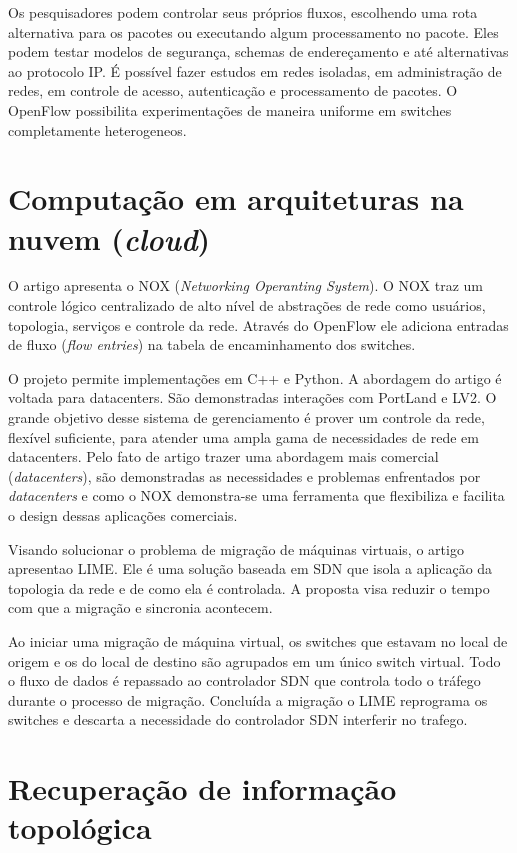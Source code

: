 Os pesquisadores podem controlar seus próprios fluxos, escolhendo uma rota
alternativa para os pacotes ou executando algum processamento no pacote. 
Eles podem testar modelos de segurança, schemas de endereçamento e até 
alternativas ao protocolo IP. 
É possível fazer estudos em redes isoladas, em administração de redes, 
em controle de acesso, autenticação e processamento de pacotes.
O OpenFlow possibilita experimentações de maneira uniforme em switches 
completamente heterogeneos. 

\section{Computação em arquiteturas na nuvem (\emph{cloud})}

O artigo \citep{arsalan2009applying} apresenta o NOX 
(\emph{Networking Operanting System}). 
O NOX traz um controle lógico centralizado de alto nível de abstrações de 
rede como usuários, topologia, serviços e controle da rede. 
Através do OpenFlow ele adiciona entradas de fluxo (\emph{flow entries}) na 
tabela de encaminhamento dos switches. 

O projeto permite implementações em C++ e Python. 
A abordagem do artigo é voltada para datacenters. 
São demonstradas interações com PortLand e LV2. 
O grande objetivo desse sistema de gerenciamento é prover um controle da rede,
flexível suficiente, para atender uma ampla gama de necessidades de rede em 
datacenters. 
Pelo fato de artigo trazer uma abordagem mais comercial (\emph{datacenters}), 
são demonstradas as necessidades e problemas enfrentados por 
\emph{datacenters} e como o NOX demonstra-se uma ferramenta que flexibiliza 
e facilita o design dessas aplicações comerciais.

Visando solucionar o problema de migração de máquinas virtuais, 
o artigo \citep{erik2012live} apresentao LIME.
Ele é uma solução baseada em SDN que isola a aplicação da topologia da rede e 
de como ela é controlada. 
A proposta visa reduzir o tempo com que a migração e sincronia acontecem.

Ao iniciar uma migração de máquina virtual, os switches que estavam no local 
de origem e os do local de destino são agrupados em um único switch virtual. 
Todo o fluxo de dados é repassado ao controlador SDN que controla todo o 
tráfego durante o processo de migração. 
Concluída a migração o LIME reprograma os switches e descarta a necessidade 
do controlador SDN interferir no trafego.

\section{Recuperação de informação topológica}

